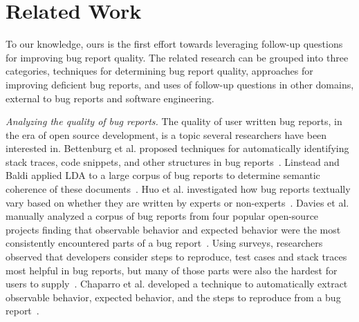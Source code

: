 \section{Related Work}
To our knowledge, ours is the first effort towards leveraging follow-up questions for improving bug report quality. The related research can be grouped into three categories, techniques for determining bug report quality, approaches for improving deficient bug reports, and uses of follow-up questions in other domains, external to bug reports and software engineering.

\noindent
{\em Analyzing the quality of bug reports.} The quality of user written bug reports, in the era of open source development, is a topic several researchers have been interested in. Bettenburg et al. proposed techniques for automatically identifying stack traces, code snippets, and other structures in bug reports~\cite{bettenburg08extracting}. Linstead and Baldi applied LDA to a large corpus of bug reports to determine semantic coherence of these documents~\cite{linstead09mining}. Huo et al. investigated how bug reports textually vary based on whether they are written by experts or non-experts~\cite{Huo2014AnES}. Davies et al. manually analyzed a corpus of bug reports from four popular open-source projects finding that observable behavior and expected behavior were the most consistently encountered parts of a bug report~\cite{davies14whats}. Using surveys, researchers observed that developers consider steps to reproduce, test cases and stack traces most helpful in bug reports, but many of those parts were also the hardest for users to supply~\cite{sasso2016satisficing}. Chaparro et al. developed a technique to automatically extract observable behavior, expected behavior, and the steps to reproduce from a bug report~\cite{chaparro17detecting}.

